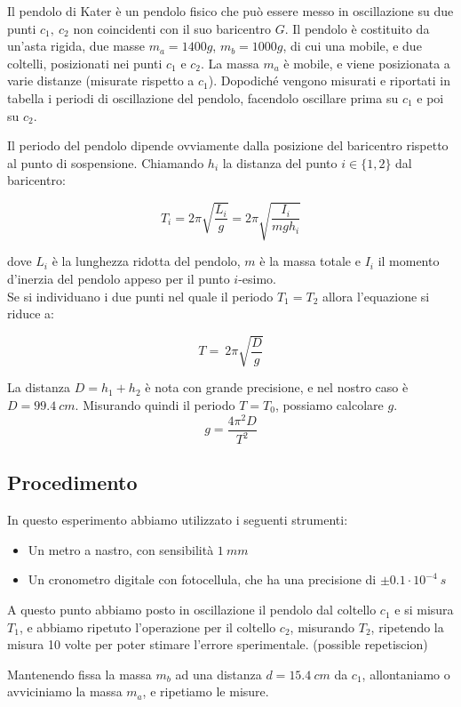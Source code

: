Il pendolo di Kater è un pendolo fisico che può essere messo in oscillazione su due punti $c_1,\ c_2$ non coincidenti con il suo baricentro $G$. Il pendolo è costituito da un'asta rigida, due masse $m_a = 1400g$, $m_b=1000g$, di cui una mobile, e due coltelli, posizionati nei punti $c_1$ e $c_2$. La massa $m_a$ è mobile, e viene posizionata a varie distanze (misurate rispetto a $c_1$). Dopodiché vengono misurati e riportati in tabella i periodi di oscillazione del pendolo, facendolo oscillare prima su $c_1$ e poi su $c_2$.

Il periodo del pendolo dipende ovviamente dalla posizione del baricentro rispetto al punto di sospensione. Chiamando $h_i$ la distanza del punto $i\in\{1,2\}$ dal baricentro:

$$ T_i = 2 \pi \sqrt{\frac{L_i}{g}} = 2 \pi \sqrt{\frac{I_i}{m gh_i}}$$

dove $L_i$ è la lunghezza ridotta del pendolo, $m$ è la massa totale e $I_i$ il momento d'inerzia del pendolo appeso per il punto $i$-esimo.
\\
Se si individuano i due punti nel quale il periodo $T_1 = T_2$ allora l'equazione si riduce a:

$$ T = \ 2 \pi \sqrt{\frac{D}{g}}$$

La distanza $D= h_1 + h_2 $  è nota con grande precisione, e nel nostro caso è $D=99.4\ cm$. Misurando quindi il periodo $T=T_0$, possiamo calcolare $g$.
$$ g = \frac{4\pi^2D}{T^2}$$
\subsection{Procedimento}

In questo esperimento abbiamo utilizzato i seguenti strumenti:
\begin{itemize}
  \item Un metro a nastro, con sensibilità $1\ mm$
  \item Un cronometro digitale con fotocellula, che ha una precisione di $\pm 0.1 \cdot 10^{-4}\ s$
\end{itemize}

A questo punto abbiamo posto in oscillazione il pendolo dal coltello $c_1$ e si misura $T_1$, e abbiamo ripetuto l'operazione per il coltello $c_2$, misurando $T_2$, ripetendo la misura 10 volte per poter stimare l'errore sperimentale. (possible repetiscion)

Mantenendo fissa la massa $m_b$ ad una distanza $d = 15.4\ cm$ da $c_1$, allontaniamo o avviciniamo la massa $m_a$, e ripetiamo le misure.


